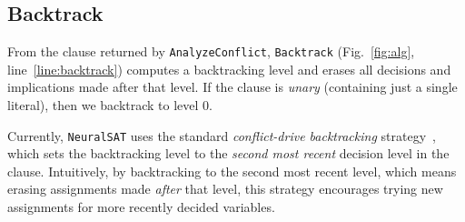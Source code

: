 \documentclass[oneside,11pt,dvipsnames]{book}
\numberwithin{equation}{section}
\theoremstyle{definition}
\theoremstyle{remark}
\newcommand{\tvn}[1]{\iftoggle{usecomment}{{\color{red}{[TVN]: #1}}}{}}
\newcommand{\hd}[1]{\iftoggle{usecomment}{{\color{blue}{[HD]: #1}}}{}}
\newcommand{\tool}{\texttt{NeuralSAT}}
\begin{document}




\subsection{Backtrack} \label{sec:backtrack}
From the clause returned by \texttt{AnalyzeConflict}, \texttt{Backtrack}  (Fig.~\ref{fig:alg}, line~\ref{line:backtrack}) computes a backtracking level and erases all decisions and implications made after that level.
If the clause is \emph{unary} (containing just a single literal), then we backtrack to level 0. %

Currently, \tool{} uses the standard \emph{conflict-drive backtracking} strategy~\cite{barrett2013decision}, which sets the backtracking level to the \emph{second most recent} decision level in the clause.
Intuitively, by backtracking to the second most recent level, which means erasing assignments made \emph{after} that level, this strategy encourages trying new assignments for more recently decided variables.

\end{document}
